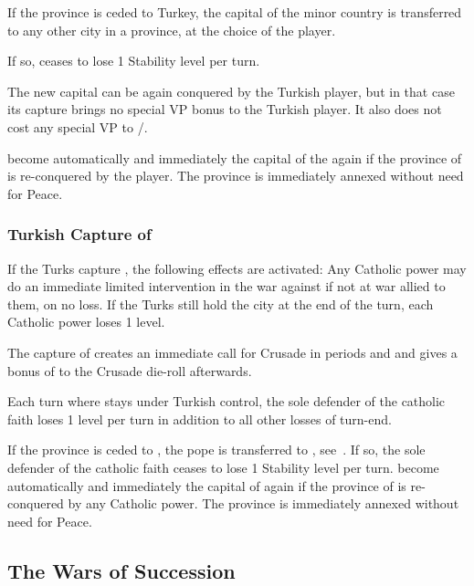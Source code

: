 If the province  is ceded to Turkey, the capital of the
 minor country is transferred to any other city in a
 province, at the choice of the \HAB player.

\bparag If so, \HAB ceases to lose 1 Stability level per turn.

\bparag The new capital can be again conquered by the Turkish player, but in
that case its capture brings no special VP bonus to the Turkish player. It
also does not cost any special VP to \HAB/\AUS.

\bparag {} become automatically and immediately the capital of the
 again if the province of  is
re-conquered by the \HAB player. The province is immediately annexed without
need for Peace.


\subsubsection{Turkish Capture of \villeRoma}\label{chSpecific:Fall Roma}
\aparag If the Turks capture , the following effects are
activated:
\bparag Any Catholic power may do an immediate limited intervention in the war
against \TUR if not at war allied to them, on no \STAB loss.
\bparag If the Turks still hold the city at the end of the turn, each Catholic
power loses 1 \STAB level.

 The capture of \villeRoma creates an
immediate call for Crusade in periods  and  and gives a
bonus of  to the Crusade die-roll afterwards.

Each turn where \villeRoma stays under Turkish control, the sole defender of
the catholic faith loses 1 \STAB level per turn in addition to all other
losses of turn-end.

If the province \provinceLazio is ceded to \TUR, the pope is transferred to
\VENven, see~.
\bparag If so, the sole defender of the catholic faith ceases to lose 1
Stability level per turn.
\bparag \villeRoma become automatically and immediately the capital of
\payspapaute again if the province of  is re-conquered by any
Catholic power. The province is immediately annexed without need for Peace.



\subsection{The Wars of Succession}

